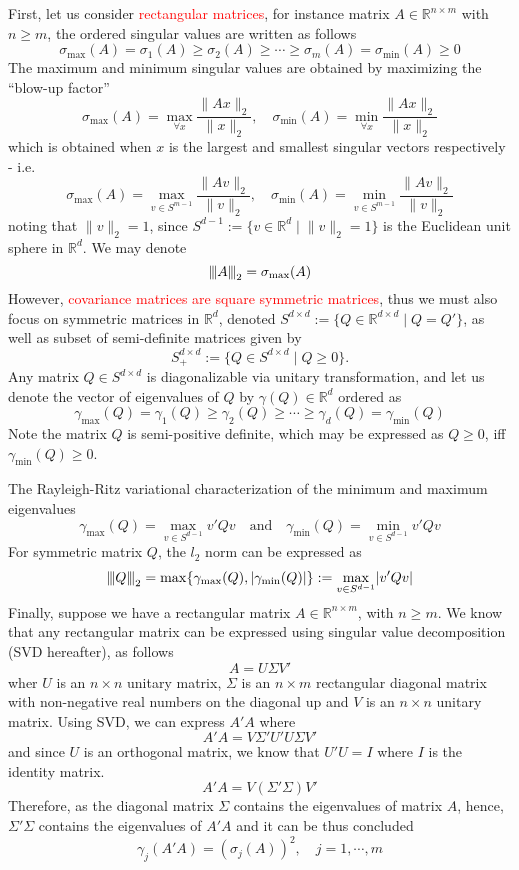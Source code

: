 \documentclass[10pt,handout,english]{beamer}
\newcommand{\R}{\mathbb{R}}
\newcommand{\vertiii}[1]{{\left\vert\kern-0.25ex\left\vert\kern-0.25ex\left\vert #1 
    \right\vert\kern-0.25ex\right\vert\kern-0.25ex\right\vert}}
\begin{document}
\begin{frame}[allowframebreaks]
First, let us consider \textcolor{red}{rectangular matrices}, for instance matrix $A\in\R^{n\times m}$ with $n\geq m$, the ordered singular values are written as follows
\[
\sigma_{\max}(A)=\sigma_1(A)\geq\sigma_{2}(A)\geq\cdots\geq\sigma_m(A)=\sigma_{\min}(A)\geq 0
\]
The maximum and minimum singular values are obtained by maximizing the \textquotedblleft blow-up factor\textquotedblright
\[
\sigma_{\max}(A)=\max_{\forall x}\frac{\lVert Ax \rVert_2}{\lVert x\rVert_2},\quad \sigma_{\min}(A)=\min_{\forall x}\frac{\lVert Ax \rVert_2}{\lVert x\rVert_2}
\]
which is obtained when $x$ is the largest and smallest singular vectors respectively - i.e.
\[
\sigma_{\max}(A)=\max_{v\in S^{m-1}}\frac{\lVert Av \rVert_2}{\lVert v\rVert_2},\quad \sigma_{\min}(A)=\min_{v\in S^{m-1}}\frac{\lVert Av \rVert_2}{\lVert v\rVert_2}
\]
noting that $\lVert v\rVert_2=1$, since $S^{d-1}:=\{v\in\R^d\mid \lVert v\rVert_2=1\}$ is the Euclidean unit sphere in $\R^d$. We may denote
\[
\vertiii{A}_2=\sigma_{\max}(A)
\]
However, \textcolor{red}{covariance matrices are square symmetric matrices}, thus we must also focus on symmetric matrices in $\R^d$, denoted $S^{d\times d}:=\{Q\in\R^{d\times d}\mid Q=Q'\}$, as well as subset of semi-definite matrices given by
\[
S_{+}^{d\times d}:=\{Q\in S^{d\times d}\mid Q\geq 0\}.
\]
Any matrix $Q\in S^{d\times d}$ is diagonalizable via unitary transformation, and let us denote the vector of eigenvalues of $Q$ by $\gamma(Q)\in\R^d$ ordered as 
\[
\gamma_{\max}(Q)=\gamma_1(Q)\geq \gamma_2(Q) \geq\cdots\geq\gamma_d(Q)=\gamma_{\min}(Q)
\]
Note the matrix $Q$ is semi-positive definite, which may be expressed as $Q\geq 0$, iff $\gamma_{\min}(Q)\geq 0$.

The Rayleigh-Ritz variational characterization of the minimum and maximum eigenvalues 
\[
\gamma_{\max}(Q)=\max_{v\in S^{d-1}}v'Qv\quad\text{and}\quad\gamma_{\min}(Q)=\min_{v\in S^{d-1}}v'Qv
\]
For symmetric matrix $Q$, the $l_2$ norm can be expressed as 
\[
\vertiii{Q}_2=\max\{\gamma_{\max}(Q), \lvert\gamma_{\min}(Q)\rvert\}:=\max_{v\in S^{d-1}}\lvert v'Qv\rvert
\]
Finally, suppose we have a rectangular matrix $A\in\R^{n\times m}$, with $n\geq m$. We know that any rectangular matrix can be expressed using singular value decomposition (SVD hereafter), as follows 
\[
A=U\Sigma V'
\]
wher $U$ is an $n\times n$ unitary matrix, $\Sigma$ is an $n\times m$ rectangular diagonal matrix with non-negative real numbers on the diagonal up and $V$ is an $n\times n$ unitary matrix. Using SVD, we can express $A'A$ where
\[
A'A=V\Sigma' U'U\Sigma V'
\]
and since $U$ is an orthogonal matrix, we know that $U'U=I$ where $I$ is the identity matrix.
\[
A'A=V(\Sigma'\Sigma) V'
\]
Therefore, as the diagonal matrix $\Sigma$ contains the eigenvalues of matrix $A$, hence, $\Sigma'\Sigma$ contains the eigenvalues of $A'A$ and it can be thus concluded
\[
\gamma_j(A'A)=(\sigma_j(A))^2,\quad j=1,\cdots,m
\]
\end{frame}
\end{document}
